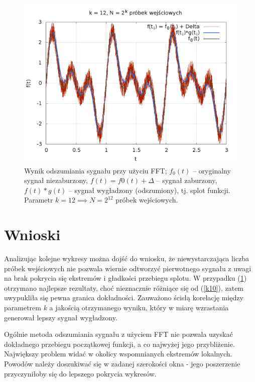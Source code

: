\begin{figure}[h!]
	\begin{center}
	\includegraphics[height=0.41\linewidth]{k12.png}
	\caption{Wynik  odszumiania  sygnału  przy  użyciu  FFT; $  f_0(t) $ – oryginalny  sygnał  niezaburzony, $ f(t) = f0(t) + \Delta $ – sygnał zaburzony, $ f(t)\ast g(t) $ – sygnał wygładzony (odszumiony), tj. splot funkcji. Parametr $k = 12 \implies N = 2^{12}$ próbek wejściowych.}
	\label{k12} 
\end{center}
\end{figure}

\newpage
\section{Wnioski}

Analizując kolejne wykresy można dojść do wniosku, że niewystarczająca liczba próbek wejściowych nie pozwala wiernie odtworzyć pierwotnego sygnału z uwagi na brak pokrycia się ekstremów i gładkości przebiegu splotu. W przypadku (\ref{k12}) otrzymano najlepsze rezultaty, choć nieznacznie różniące się od (\ref{k10}), zatem uwypukliła się pewna granica dokładności. Zauważono ścisłą korelację między parametrem $ k $ a jakością otrzymanego wyniku, który w miarę wzrastania generował lepszy sygnał wygładzony.

Ogólnie metoda odszumiania sygnału z użyciem FFT nie pozwala uzyskać dokładnego przebiegu początkowej funkcji, a co najwyżej jego przybliżenie. Największy problem widać w okolicy wspomnianych ekstremów lokalnych. Powodów należy doszukiwać się w zadanej szerokości okna - jego poszerzenie przyczyniłoby się do lepszego pokrycia wykresów.

